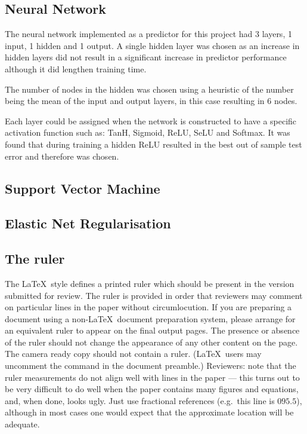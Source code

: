 \documentclass[10pt,twocolumn,letterpaper]{article}
\begin{document}
\subsection{Neural Network}
The neural network implemented as a predictor for this project had 3 layers, 1 input, 1 hidden and 1 output. A single hidden layer was chosen as an increase in hidden layers did not result in a significant increase in predictor performance although it did lengthen training time.

The number of nodes in the hidden was chosen using a heuristic of the number being the mean of the input and output layers, in this case resulting in 6 nodes.

Each layer could be assigned when the network is constructed to have a specific activation function such as: TanH, Sigmoid, ReLU, SeLU and Softmax. It was found that during training a hidden ReLU resulted in the best out of sample test error and therefore was chosen. 

\subsection{Support Vector Machine}

\subsection{Elastic Net Regularisation}

\subsection{The ruler}
The \LaTeX\ style defines a printed ruler which should be present in the
version submitted for review.  The ruler is provided in order that
reviewers may comment on particular lines in the paper without
circumlocution.  If you are preparing a document using a non-\LaTeX\
document preparation system, please arrange for an equivalent ruler to
appear on the final output pages.  The presence or absence of the ruler
should not change the appearance of any other content on the page.  The
camera ready copy should not contain a ruler. (\LaTeX\ users may uncomment
the command in the document preamble.)  Reviewers:
note that the ruler measurements do not align well with lines in the paper
--- this turns out to be very difficult to do well when the paper contains
many figures and equations, and, when done, looks ugly.  Just use fractional
references (e.g.\ this line is $095.5$), although in most cases one would
expect that the approximate location will be adequate.
\end{document}

